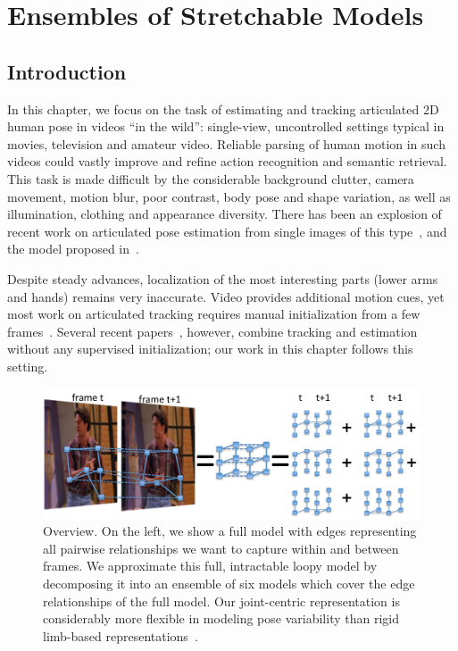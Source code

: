 \chapter{Ensembles of Stretchable Models} \label{sec:stretchable}
\section{Introduction}


In this chapter, we focus on the task of estimating and tracking articulated 2D 
human pose in videos ``in the wild'': single-view, uncontrolled settings 
typical in movies, television and amateur video.   Reliable
parsing of human motion in such videos could vastly improve and refine action 
recognition and semantic retrieval. This task is made difficult by the 
considerable background clutter, camera movement, motion blur, poor contrast, 
body pose and shape variation, as well as illumination, clothing and appearance 
diversity. There has been an explosion of recent work on articulated pose 
estimation from single images of this type~\citep{ronfard02, 
miko04,felz05,devaparse,ferrari08,eichner09, andriluka09}, and the model 
proposed in~.  

Despite steady advances, localization of the most interesting parts (lower arms 
and hands) remains very inaccurate.  Video provides additional motion cues, yet 
most work on articulated tracking requires manual initialization from a few
frames~\citep{cardboard02,bregler98,balan06,sminchisescu03,ren07,buehler08}.  
Several recent papers~\citep{sigal04, lan05,ramanan05,ferrari08,weisssapp10}, 
however, combine tracking and estimation without any supervised initialization; 
our work in this chapter follows this setting.

\begin{figure}[t!]
\centering
\includegraphics[width=0.99\linewidth]{figs/stretchable-overview.pdf}
\caption[Stretchable Ensembles overview]{\label{fig:overview} Overview.  On the 
left, we show a full model with edges representing all pairwise relationships 
we want to capture within and between frames.  We approximate this full, 
intractable loopy model by decomposing it into an ensemble of six models which 
cover the edge relationships of the full model.  Our joint-centric 
representation is considerably more flexible in modeling pose variability than 
rigid limb-based 
representations~\citep{ferrari08,sapp2010cascades,andriluka09}.}
\label{fig:stretchable-overview}
\end{figure}

